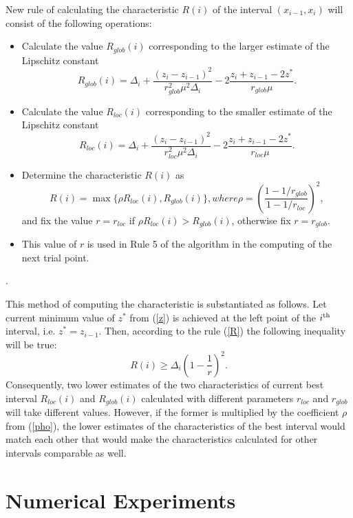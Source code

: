 \documentclass[runningheads]{llncs}
\begin{document}
New rule of calculating the characteristic $R(i)$ of the interval $(x_{i-1}, x_i)$ will consist of the following operations:
\begin{itemize}
\item
Calculate the value $R_{glob}(i)$ corresponding to the larger estimate of the Lipschitz constant
\[
R_{glob}(i)=\Delta_i+\frac{(z_i-z_{i-1})^2}{r_{glob}^2\mu^2\Delta_i}-2\frac{z_i+z_{i-1}-2z^*}{r_{glob}\mu}.
\]
\item
Calculate the value $R_{loc}(i)$ corresponding to the smaller estimate of the Lipschitz constant
\[
R_{loc}(i)=\Delta_i+\frac{(z_i-z_{i-1})^2}{r_{loc}^2\mu^2\Delta_i}-2\frac{z_i+z_{i-1}-2z^*}{r_{loc}\mu}.
\]
\item
Determine the characteristic $R(i)$ as
\begin{equation}\label{pho}
R(i) = \max\{\rho R_{loc}(i),R_{glob}(i)\}, where \rho = \left(\frac{1-1/r_{glob}}{1-1/r_{loc}}\right)^2,
\end{equation}
and fix the value $r = r_{loc}$ if $\rho R_{loc}(i) > R_{glob}(i)$, otherwise fix $r=r_{glob}$.
\item
This value of $r$ is used in Rule 5 of the algorithm in the computing of the next trial point.   
\end{itemize}.

This method of computing the characteristic is substantiated as follows. 
Let current minimum value of $z^*$ from (\ref{z}) is achieved at the left point of the $i^{\rm th}$ interval, i.e. $z^* = z_{i-1}$. Then, according to the rule (\ref{R}) the following inequality will be true: 
\[
R(i) \geq \Delta_i \left( 1 - \frac{1}{r} \right)^2.
\]
Consequently, two lower estimates of the two characteristics of current best interval $R_{loc}(i)$ and $R_{glob}(i)$ calculated with different parameters $r_{loc}$ and $r_{glob}$ will take different values.
However, if the former is multiplied by the coefficient $\rho$ from (\ref{pho}), the lower estimates of the characteristics of the best interval would match each other that would make the characteristics calculated for other intervals comparable as well.

\section{Numerical Experiments}
\end{document}

